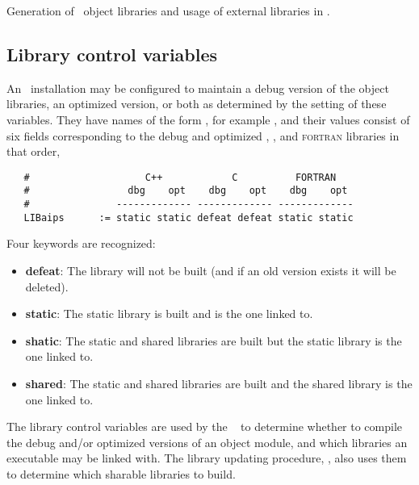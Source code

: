 
Generation of \aipspp\ object libraries and usage of external libraries in
\aipspp.

\subsection*{Library control variables}



An \aipspp\ installation may be configured to maintain a debug version of the
object libraries, an optimized version, or both as determined by the setting
of these variables.  They have names of the form ,
for example , and their values consist of six fields
corresponding to the debug and optimized \cplusplus, , and
\textsc{fortran} libraries in that order,

\begin{verbatim}
   #                    C++            C          FORTRAN
   #                 dbg    opt    dbg    opt    dbg    opt
   #               ------------- ------------- -------------
   LIBaips      := static static defeat defeat static static
\end{verbatim}

\noindent
Four keywords are recognized:
\begin{itemize}
\item
   \textbf{defeat}: The library will not be built (and if an old version
   exists it will be deleted).
\item
   \textbf{static}: The static library is built and is the one linked to.
\item
   \textbf{shatic}: The static and shared libraries are built but the static
   library is the one linked to.
\item
   \textbf{shared}: The static and shared libraries are built and the shared
   library is the one linked to.
\end{itemize}

The library control variables are used by the \aipspp\  to
determine whether to compile the debug and/or optimized versions of an object
module, and which libraries an executable may be linked with.  The library
updating procedure, , also uses them to determine which
sharable libraries to build.


